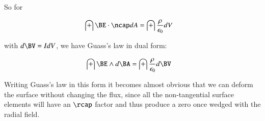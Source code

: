 \documentclass{article}
\begin{document}
So for

\begin{align*}
\int \BE \cdot \ncap dA
&= \int \frac{\rho}{\epsilon_0} dV
\end{align*}

with $d\BV = I dV$, we have Guass's law in dual form:

\begin{align*}
\int \BE \wedge d\BA &= \int \frac{\rho}{\epsilon_0} d\BV
\end{align*}

Writing Guass's law in this form it becomes almost obvious that we can 
deform the surface without changing the flux, since all the non-tangential
surface elements will have an $\rcap$ factor and thus produce a zero
once wedged with the radial field.



\end{document}
